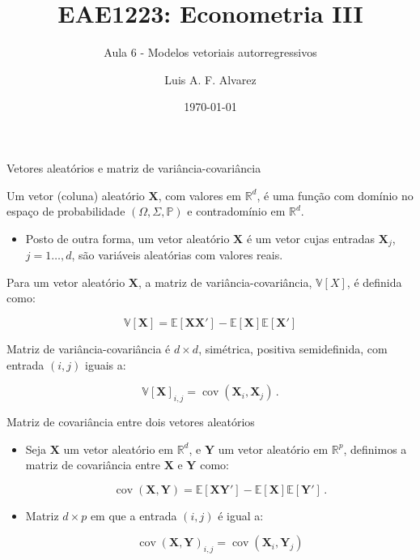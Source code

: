 \documentclass[11pt]{beamer}
\author{Luis A. F. Alvarez}
\title{EAE1223: Econometria III}
\subtitle{Aula 6 - Modelos vetoriais autorregressivos}
\date{\today}
\newenvironment{halfwideitemize}{\itemize\addtolength{\itemsep}{0.5em}}{\enditemize}
\begin{document}
\begin{frame}[plain]
	\maketitle
\end{frame}

\begin{frame}{Vetores aleatórios e matriz de variância-covariância}
\begin{halfwideitemize}
	\item Um vetor (coluna) aleatório $\boldsymbol{X}$, com valores em $\mathbb{R}^d$, é uma função com domínio no espaço de probabilidade $(\Omega,\Sigma,\mathbb{P})$ e contradomínio em $\mathbb{R}^d$.
\begin{itemize}
	\item Posto de outra forma, um vetor aleatório  $\boldsymbol{X}$ é um vetor cujas entradas $\boldsymbol{X}_j$, $j=1\ldots, d$, são variáveis aleatórias com valores reais.
\end{itemize}
\item Para um vetor aleatório $\boldsymbol{X}$, a matriz de variância-covariância, $\mathbb{V}[X]$, é definida como:

$$\mathbb{V}[\boldsymbol{X}]  = \mathbb{E}[\boldsymbol{X}\boldsymbol{X}'] - \mathbb{E}[\boldsymbol{X}]\mathbb{E}[\boldsymbol{X}']$$

\item Matriz de variância-covariância é $d \times d$, simétrica, positiva semidefinida, com entrada $(i,j)$ iguais a:

$$\mathbb{V}[\boldsymbol{X}]_{i,j}= \operatorname{cov}(\boldsymbol{X}_i,\boldsymbol{X}_j)\, .$$

\end{halfwideitemize}
\end{frame}

\begin{frame}{Matriz de covariância entre dois vetores aleatórios}
	\begin{itemize}
		\item Seja $\boldsymbol{X}$ um vetor aleatório em $\mathbb{R}^d$, e $\boldsymbol{Y}$ um vetor aleatório em $\mathbb{R}^p$, definimos a matriz de covariância entre $\boldsymbol{X}$ e $\boldsymbol{Y}$  como:
		
		$$\operatorname{cov}(\boldsymbol{X},\boldsymbol{Y}) = \mathbb{E}[\boldsymbol{X}\boldsymbol{Y}'] - \mathbb{E}[\boldsymbol{X}]\mathbb{E}[\boldsymbol{Y}'] \, .$$
		\item Matriz $d \times p$ em que a entrada $(i,j)$ é igual a:
		
		$$\operatorname{cov}(\boldsymbol{X},\boldsymbol{Y})_{i,j} = \operatorname{cov}(\boldsymbol{X}_i,\boldsymbol{Y}_j)$$
	\end{itemize}
\end{frame}
\end{document}

